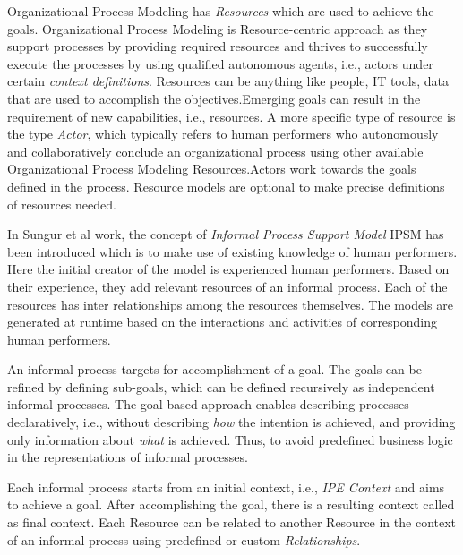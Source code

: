 \hspace{4ex} Organizational Process Modeling  has \textit{Resources} which are used to achieve the goals. Organizational Process Modeling is Resource-centric approach as they support processes by providing required resources and thrives to successfully execute the processes by using qualified autonomous agents, i.e., actors under certain \textit{context definitions}.  Resources can be anything like people, IT tools, data that are used to accomplish the objectives.Emerging goals can result in the requirement of new capabilities, i.e., resources. A more specific type of resource is the type \textit{Actor}, which typically refers to human performers who autonomously and collaboratively conclude an organizational process using other available Organizational Process Modeling Resources.Actors work towards the goals defined in the process. Resource models are optional to make precise definitions of resources needed.

\hspace{4ex} In Sungur et al \cite{Sungur2014a} work, the concept of \textit{Informal Process Support Model} IPSM has been introduced which is to make use of existing knowledge of human performers. Here the initial creator of the model is experienced human performers. Based on their experience, they add relevant  resources of an informal process. Each of the resources has inter relationships among the resources themselves. The models are generated at runtime based on the interactions and activities of corresponding human performers. 

\hspace{4ex} An informal process targets for accomplishment of a goal. The goals can be refined by defining sub-goals, which can be defined recursively as independent informal processes. The goal-based approach enables describing processes declaratively, i.e., without describing \textit{how} the intention is achieved, and providing only information about \textit{what} is achieved. Thus, to avoid predefined business logic in the representations of informal processes. 

\hspace{4ex} Each informal process starts from an initial context, i.e., \textit{IPE Context} and aims to achieve a goal. After accomplishing the goal, there is a resulting context called as final context. Each Resource can be related to another Resource in the context of an informal process using predefined or custom \textit{Relationships}.

